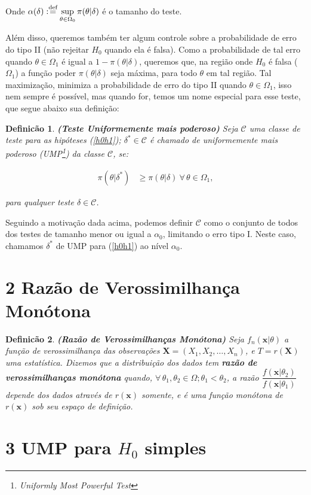 \documentclass[a4paper,10pt, notitlepage]{report}
\newtheorem{defi}{Definicão}
\newcommand{\rs}{X_1, X_2, \ldots, X_n} %
\newcommand{\bX}{\boldsymbol{X}} %
\newcommand{\bx}{\boldsymbol{x}} %
\newcommand{\defn}{\stackrel{\textrm{\scriptsize def}}{=}}
\newcommand{\mysection}[2]{\setcounter{section}{#1}\addtocounter{section}{-1}\section*{#1 #2}}
\begin{document}
	Onde $\displaystyle\alpha(\delta):\defn\sup_{\theta\in\Omega_0}\pi(\theta|\delta)$ é o tamanho do teste.
	
	
	
	Além disso, queremos também ter algum controle sobre a probabilidade de erro do tipo II (não rejeitar $H_0$ quando ela é falsa). Como a probabilidade de tal erro quando $\theta \in \Omega_1$ é igual a $1-\pi(\theta|\delta)$, queremos que, na região onde $H_0$ é falsa ($\Omega_1$) a função poder $\pi(\theta|\delta)$ seja máxima, para todo $\theta$ em tal região. Tal maximização, minimiza a probabilidade de erro do tipo II quando $\theta\in\Omega_1$, isso nem sempre é possível, mas quando for, temos um nome especial para esse teste, que segue abaixo sua definição:
	
	\begin{defi}
		\textbf{(Teste Uniformemente mais poderoso)}
		\label{ump} 
		Seja $\mathcal{C}$ uma classe de teste para as hipóteses (\ref{h0h1}); $\delta^*\in\mathcal{C}$ é chamado de uniformemente mais poderoso (UMP\footnote{Uniformly Most Powerful Test}) da classe $\mathcal{C}$, se:
		
		\begin{align*}\pi(\theta|\delta^*)&\geq\pi(\theta|\delta) ~\forall \,\theta \in \Omega_1,
		\end{align*}
		
		para qualquer teste $\delta\in\mathcal{C}$.
		
	\end{defi} 
	Seguindo a motivação dada acima, podemos definir $\mathcal{C}$ como o conjunto de todos dos testes de tamanho menor ou igual a $\alpha_0$, limitando o erro tipo I. Neste caso, chamamos $\delta^*$ de UMP para (\ref{h0h1}) ao nível $\alpha_0$.
	
	\mysection{2}{Razão de Verossimilhança Monótona}
	
	\begin{defi}
		\textbf{(Razão de Verossimilhanças Monótona)} Seja $f_n(\bx|\theta)$ a função de verossimilhança das observações $\bX = (\rs)$, e $T=r(\bX)$ uma estatística. Dizemos que a distribuição dos dados tem \textbf{razão de verossimilhanças monótona} quando, $\forall\,\theta_1,\theta_2\in\Omega; \theta_1<\theta_2$, a razão $\dfrac{f(\bx|\theta_2)}{f(\bx|\theta_1)}$ depende dos dados através de $r(\bx)$ somente, e é uma função monótona de $r(\bx)$ sob seu espaço de definição.
	\end{defi}

	\mysection{3}{UMP para $H_0$ simples}
	
\end{document}
